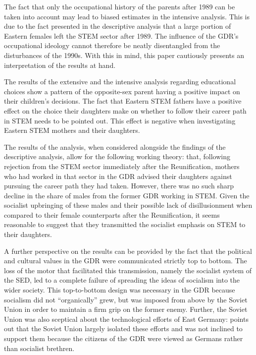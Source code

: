 \documentclass[a4paper, oneside, hyperfootnotes = false]{article}
\begin{document}
{The fact that only the occupational history of the parents after 1989 can be taken into account may lead to biased estimates in the intensive analysis. This is due to the fact presented in the descriptive analysis that a large portion of Eastern females left the STEM sector after 1989. The influence of the GDR's occupational ideology cannot therefore be neatly disentangled from the disturbances of the 1990s. With this in mind, this paper cautiously presents an interpretation of the results at hand.

The results of the extensive and the intensive analysis regarding educational choices show a pattern of the opposite-sex parent having a positive impact on their children's decisions.
The fact that Eastern STEM fathers have a positive effect on the choice their daughters make on whether to follow their career path in STEM needs to be pointed out.
This effect is negative when investigating Eastern STEM mothers and their daughters.

The results of the analysis, when considered alongside the findings of the descriptive analysis, allow for the following working theory:
that, following rejection from the STEM sector immediately after the Reunification, mothers who had worked in that sector in the GDR advised their daughters against pursuing the career path they had taken.
However, there was no such sharp decline in the share of males from the former GDR working in STEM.
Given the socialist upbringing of these males and their possible lack of disillusionment when compared to their female counterparts after the Reunification, it seems reasonable to suggest that they transmitted the socialist emphasis on STEM to their daughters.

A further perspective on the results can be provided by the fact that the political and cultural values in the GDR were communicated strictly top to bottom.
The loss of the motor that facilitated this transmission, namely the socialist system of the SED, led to a complete failure of spreading the ideas of socialism into the wider society.
This top-to-bottom design was necessary in the GDR because socialism did not ``organically'' grew, but was imposed from above by the Soviet Union in order to maintain a firm grip on the former enemy.
Further, the Soviet Union was also sceptical about the technological efforts of East Germany:
\cite{Hoegselius2009} points out that the Soviet Union largely isolated these efforts and was not inclined to support them because the citizens of the GDR were viewed as Germans rather than socialist brethren.

}
\end{document}
